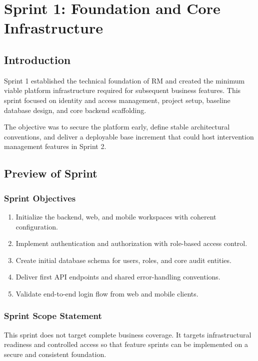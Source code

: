 \chapter{Sprint 1: Foundation and Core Infrastructure}

\section{Introduction}

Sprint 1 established the technical foundation of RM and created the minimum viable platform infrastructure required for subsequent business features. This sprint focused on identity and access management, project setup, baseline database design, and core backend scaffolding.

The objective was to secure the platform early, define stable architectural conventions, and deliver a deployable base increment that could host intervention management features in Sprint 2.

\section{Preview of Sprint}

\subsection{Sprint Objectives}

\begin{enumerate}
\item Initialize the backend, web, and mobile workspaces with coherent configuration.
\item Implement authentication and authorization with role-based access control.
\item Create initial database schema for users, roles, and core audit entities.
\item Deliver first API endpoints and shared error-handling conventions.
\item Validate end-to-end login flow from web and mobile clients.
\end{enumerate}

\subsection{Sprint Scope Statement}

This sprint does not target complete business coverage. It targets infrastructural readiness and controlled access so that feature sprints can be implemented on a secure and consistent foundation.

